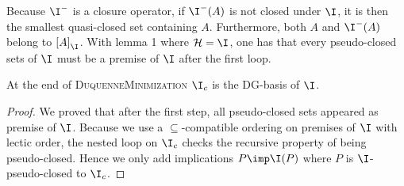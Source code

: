 Because $\I^{-}$ is a closure operator, if $\I^{-}(A)$ is not closed under $\I$,
it is then the smallest quasi-closed set containing $A$. Furthermore, both $A$
and $\I^{-}(A)$ belong to $\left[ A \right]_{\I}$. With lemma 1 where $\mathcal{H} = \I$, one has that every pseudo-closed sets of $\I$ must be a premise of $\I$ after the first loop.

\begin{proposition} At the end of \textsc{DuquenneMinimization} $\I_c$ is the
DG-basis of $\I$.
\end{proposition}

\begin{proof} We proved that after the first step, all pseudo-closed sets
	appeared as premise of $\I$. Because we use a $\subseteq$-compatible ordering on premises of $\I$ with lectic order, the nested loop on $\I_c$
	checks the recursive property of being pseudo-closed. Hence we only add
	implications $P \imp \I(P)$ where $P$ is $\I$-pseudo-closed to $\I_c$.
\end{proof}

